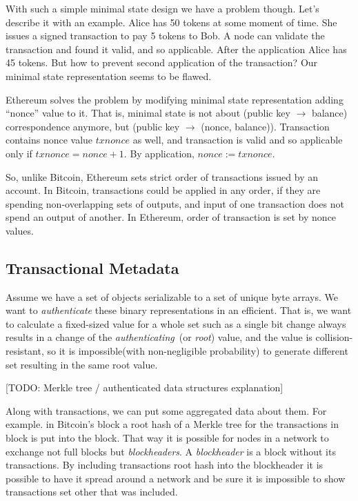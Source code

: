 \documentclass[]{report}   %
\begin{document}
With such a simple minimal state design we have a problem though. Let's describe it with an example. Alice has 50 tokens at some moment of time. She issues a signed transaction to pay 5 tokens to Bob. A node can validate the transaction and found it valid, and so applicable. After the application Alice has 45 tokens. But how to prevent second application of the transaction? Our minimal state representation seems to be flawed.

Ethereum solves the problem by modifying minimal state representation adding ``nonce'' value to it. That is, minimal state is not about (public key $\rightarrow$ balance) correspondence anymore, but (public key $\rightarrow$ (nonce, balance)). Transaction contains nonce value \(txnonce\) as well, and transaction is valid and so applicable only if \(txnonce = nonce + 1\). By application, \(nonce := txnonce\). 

So, unlike Bitcoin, Ethereum sets strict order of transactions issued by an account. In Bitcoin, transactions could be applied in any order, 
if they are spending non-overlapping sets of outputs, and input of one transaction does not spend an output of another. In Ethereum, order of transaction is set by nonce values. 



\subsection{Transactional Metadata}

Assume we have a set of objects serializable to a set of unique byte arrays. We want to \textit{authenticate} these binary representations in an efficient. That is, we want to calculate a fixed-sized value for a whole set such as a single bit change always results in a change of the \textit{authenticating}~(or \textit{root}) value, and the value is collision-resistant, so it is impossible(with non-negligible probability) to generate different set resulting in the same root value. 

[TODO: Merkle tree / authenticated data structures explanation]

Along with transactions, we can put some aggregated data about them. For example. in Bitcoin's block a root hash of a Merkle tree for the transactions in block is put into the block. That way it is possible for nodes in a network to exchange not full blocks but \textit{blockheaders}. A \textit{blockheader} is a block without its transactions. By including transactions root hash into the blockheader it is possible to have it spread around a network and be sure it is impossible to show transactions set other that was included. 
\end{document}
